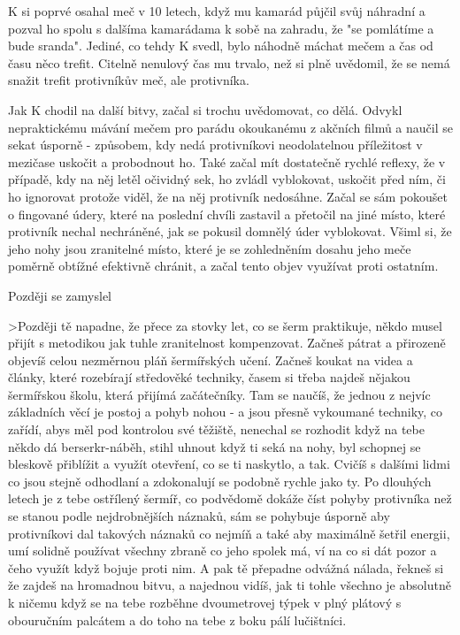 K si poprvé osahal meč v 10 letech, když mu kamarád půjčil svůj náhradní a pozval ho spolu s dalšíma kamarádama k sobě na zahradu, že "se pomlátíme a bude sranda". Jediné, co tehdy K svedl, bylo náhodně máchat mečem a čas od času něco trefit. Citelně nenulový čas mu trvalo, než si plně uvědomil, že se nemá snažit trefit protivníkův meč, ale protivníka. 

Jak K chodil na další bitvy, začal si trochu uvědomovat, co dělá. Odvykl nepraktickému mávání mečem pro parádu okoukanému z akčních filmů a naučil se sekat úsporně - způsobem, kdy nedá protivníkovi neodolatelnou příležitost v mezičase uskočit a probodnout ho. Také začal mít dostatečně rychlé reflexy, že v případě, kdy na něj letěl očividný sek, ho zvládl vyblokovat, uskočit před ním, či ho ignorovat protože viděl, že na něj protivník nedosáhne. Začal se sám pokoušet o fingované údery, které na poslední chvíli zastavil a přetočil na jiné místo, které protivník nechal nechráněné, jak se pokusil domnělý úder vyblokovat. Všiml si, že jeho nohy jsou zranitelné místo, které je se zohledněním dosahu jeho meče poměrně obtížné efektivně chránit, a začal tento objev využívat proti ostatním.

Později se zamyslel


>Později tě napadne, že přece za stovky let, co se šerm praktikuje, někdo musel přijít s metodikou jak tuhle zranitelnost kompenzovat. Začneš pátrat a přirozeně objevíš celou nezměrnou pláň šermířských učení. Začneš koukat na videa a články, které rozebírají středověké techniky, časem si třeba najdeš nějakou šermířskou školu, která přijímá začátečníky. Tam se naučíš, že jednou z nejvíc základních věcí je postoj a pohyb nohou - a jsou přesně vykoumané techniky, co zařídí, abys měl pod kontrolou své těžiště, nenechal se rozhodit když na tebe někdo dá berserkr-náběh, stihl uhnout když ti seká na nohy, byl schopnej se bleskově přiblížit a využít otevření, co se ti naskytlo, a tak. Cvičíš s dalšími lidmi co jsou stejně odhodlaní a zdokonalují se podobně rychle jako ty. Po dlouhých letech je z tebe ostřílený šermíř, co podvědomě dokáže číst pohyby protivníka než se stanou podle nejdrobnějších náznaků, sám se pohybuje úsporně aby protivníkovi dal takových náznaků co nejmíň a také aby maximálně šetřil energii, umí solidně používat všechny zbraně co jeho spolek má, ví na co si dát pozor a čeho využít když bojuje proti nim. A pak tě přepadne odvážná nálada, řekneš si že zajdeš na hromadnou bitvu, a najednou vidíš, jak ti tohle všechno je absolutně k ničemu když se na tebe rozběhne dvoumetrovej týpek v plný plátový s obouručním palcátem a do toho na tebe z boku pálí lučištníci. 



